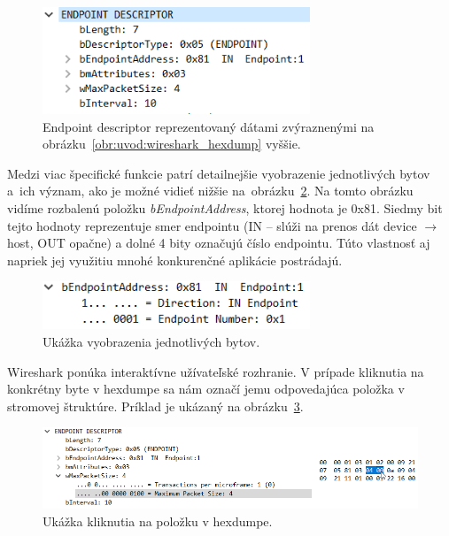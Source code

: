 \begin{figure}[!htb]
	\centering
	\includegraphics[width=8cm]{img/uvod_endpoint}
	\caption{Endpoint descriptor reprezentovaný dátami zvýraznenými na obrázku~\ref{obr:uvod:wireshark_hexdump} vyššie.}
	\label{obr:uvod:endpoint}
\end{figure}

Medzi viac špecifické funkcie patrí detailnejšie vyobrazenie jednotlivých bytov a~ich význam, ako je možné vidieť nižšie na~obrázku~\ref{obr:uvod:byte_detail_foto}. Na tomto obrázku vidíme rozbalenú položku \textit{bEndpointAddress}, ktorej hodnota je 0x81. Siedmy bit tejto hodnoty reprezentuje smer endpointu (IN -- slúži na prenos dát device $\longrightarrow$ host, OUT opačne) a dolné 4 bity označujú číslo endpointu. Túto vlastnosť aj napriek jej využitiu mnohé konkurenčné aplikácie postrádajú.

\begin{figure}[!htb]
	\centering
	\includegraphics[width=8cm]{img/uvod_byte_detail}
	\caption{Ukážka vyobrazenia jednotlivých bytov.}
	\label{obr:uvod:byte_detail_foto}
\end{figure}

Wireshark ponúka interaktívne užívateľské rozhranie. V prípade kliknutia na konkrétny byte v hexdumpe sa nám označí jemu odpovedajúca položka v stromovej štruktúre. Príklad je ukázaný na obrázku~\ref{obr:uvod:hexdump_click}.

\begin{figure}[!htb]
	\centering
	\includegraphics[width=\textwidth]{img/uvod_wireshark_hexdump_click}
	\caption{Ukážka kliknutia na položku v hexdumpe.}
	\label{obr:uvod:hexdump_click}
\end{figure}

